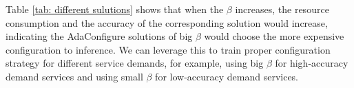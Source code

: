 \begin{table}[!t]
	\centering
	\caption{Resource consumption and F1 accuracy for different AdaConfigure solutions}
	\label{tab: different sulutions}
\end{table}

Table \ref{tab: different sulutions} shows that when the $\beta$ increases, the resource consumption and the accuracy of the corresponding solution would increase, indicating the AdaConfigure solutions of big $\beta$ would choose the more expensive configuration to inference. We can leverage this to train proper configuration strategy for different service demands, for example, using big $\beta$ for high-accuracy demand services and using small $\beta$ for low-accuracy demand services.  


